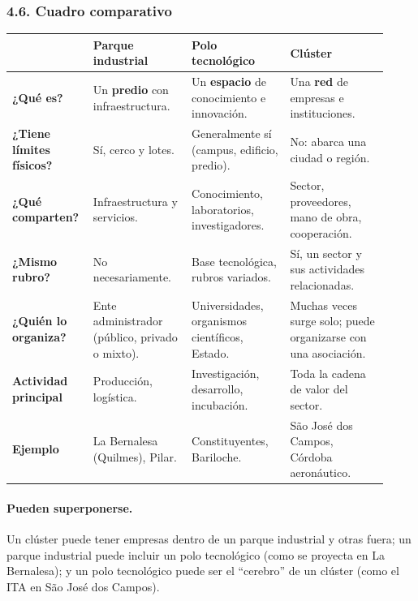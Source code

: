 \subsubsection*{4.6. Cuadro comparativo}
\begin{center}
\footnotesize
\setlength{\tabcolsep}{3pt}
\begin{tabular}{|>{\raggedright\arraybackslash}p{0.17\linewidth}|>{\raggedright\arraybackslash}p{0.25\linewidth}|>{\raggedright\arraybackslash}p{0.25\linewidth}|>{\raggedright\arraybackslash}p{0.25\linewidth}|}
\hline
 & \textbf{Parque industrial} & \textbf{Polo tecnológico} & \textbf{Clúster} \\ \hline
\textbf{¿Qué es?} & Un \textbf{predio} con infraestructura. & Un \textbf{espacio} de
conocimiento e innovación. & Una \textbf{red} de empresas e instituciones. \\ \hline
\textbf{¿Tiene límites físicos?} & Sí, cerco y lotes. & Generalmente sí (campus, edificio,
predio). & No: abarca una ciudad o región. \\ \hline
\textbf{¿Qué comparten?} & Infraestructura y servicios. & Conocimiento, laboratorios,
investigadores. & Sector, proveedores, mano de obra, cooperación. \\ \hline
\textbf{¿Mismo rubro?} & No necesariamente. & Base tecnológica, rubros variados. & Sí, un sector
y sus actividades relacionadas. \\ \hline
\textbf{¿Quién lo organiza?} & Ente administrador (público, privado o mixto). & Universidades,
organismos científicos, Estado. & Muchas veces surge solo; puede organizarse con una
asociación. \\ \hline
\textbf{Actividad principal} & Producción, logística. & Investigación, desarrollo,
incubación. & Toda la cadena de valor del sector. \\ \hline
\textbf{Ejemplo} & La Bernalesa (Quilmes), Pilar. & Constituyentes, Bariloche. & São José dos
Campos, Córdoba aeronáutico. \\ \hline
\end{tabular}
\end{center}

\paragraph*{Pueden superponerse.} Un clúster puede tener empresas dentro de un parque
industrial y otras fuera; un parque industrial puede incluir un polo tecnológico (como se
proyecta en La Bernalesa); y un polo tecnológico puede ser el ``cerebro'' de un clúster (como
el ITA en São José dos Campos).

